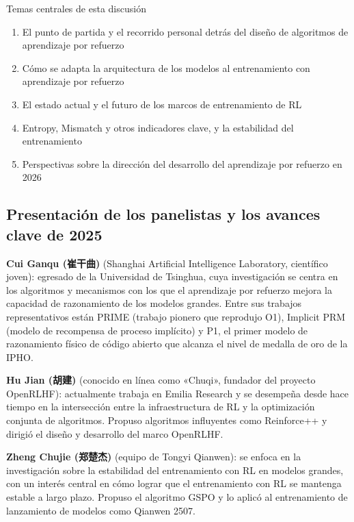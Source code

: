 \documentclass[a4paper]{article}
\begin{document}
\begin{importantbox}{Temas centrales de esta discusión}
\begin{enumerate}
    \item El punto de partida y el recorrido personal detrás del diseño de algoritmos de aprendizaje por refuerzo
    \item Cómo se adapta la arquitectura de los modelos al entrenamiento con aprendizaje por refuerzo
    \item El estado actual y el futuro de los marcos de entrenamiento de RL
    \item Entropy, Mismatch y otros indicadores clave, y la estabilidad del entrenamiento
    \item Perspectivas sobre la dirección del desarrollo del aprendizaje por refuerzo en 2026
\end{enumerate}
\end{importantbox}

\subsection{Presentación de los panelistas y los avances clave de 2025}

\textbf{Cui Ganqu (崔干曲)} (Shanghai Artificial Intelligence Laboratory, científico joven): egresado de la Universidad de Tsinghua, cuya investigación se centra en los algoritmos y mecanismos con los que el aprendizaje por refuerzo mejora la capacidad de razonamiento de los modelos grandes. Entre sus trabajos representativos están PRIME (trabajo pionero que reprodujo O1), Implicit PRM (modelo de recompensa de proceso implícito) y P1, el primer modelo de razonamiento físico de código abierto que alcanza el nivel de medalla de oro de la IPHO.

\textbf{Hu Jian (胡建)} (conocido en línea como «Chuqi», fundador del proyecto OpenRLHF): actualmente trabaja en Emilia Research y se desempeña desde hace tiempo en la intersección entre la infraestructura de RL y la optimización conjunta de algoritmos. Propuso algoritmos influyentes como Reinforce++ y dirigió el diseño y desarrollo del marco OpenRLHF.

\textbf{Zheng Chujie (郑楚杰)} (equipo de Tongyi Qianwen): se enfoca en la investigación sobre la estabilidad del entrenamiento con RL en modelos grandes, con un interés central en cómo lograr que el entrenamiento con RL se mantenga estable a largo plazo. Propuso el algoritmo GSPO y lo aplicó al entrenamiento de lanzamiento de modelos como Qianwen 2507.
\end{document}
